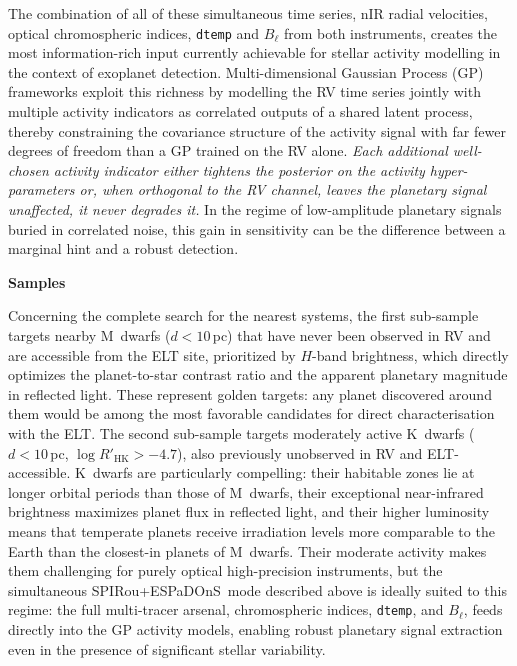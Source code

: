 \documentclass[
    traditabstract,
    longauth,
    onecolumn,
]{aa}
\def \spi{SPIRou}
\def \esp{ESPaDOnS}
\begin{document}
The combination of all of these simultaneous time series, nIR radial velocities, optical chromospheric indices, \texttt{dtemp} and $B_\ell$ from both instruments, creates the most information-rich input currently achievable for stellar activity modelling in the context of exoplanet detection.
Multi-dimensional Gaussian Process (GP) frameworks \citep{rajpaul2015, haywood_unsigned_2022, hara2025} exploit this richness by modelling the RV time series jointly with multiple activity indicators as correlated outputs of a shared latent process, thereby constraining the covariance structure of the activity signal with far fewer degrees of freedom than a GP trained on the RV alone.
\textit{Each additional well-chosen activity indicator either tightens the posterior on the activity hyper-parameters or, when orthogonal to the RV channel, leaves the planetary signal unaffected, it never degrades it.}
In the regime of low-amplitude planetary signals buried in correlated noise, this gain in sensitivity can be the difference between a marginal hint and a robust detection.



\textbf{Samples} 


Concerning the complete search for the nearest systems, the first sub-sample targets nearby M~dwarfs ($d < 10$\,pc) that have never been observed in RV and are accessible from the ELT site, prioritized by $H$-band brightness, which directly optimizes the planet-to-star contrast ratio and the apparent planetary magnitude in reflected light.
These represent golden targets: any planet discovered around them would be among the most favorable candidates for direct characterisation with the ELT.
The second sub-sample targets moderately active K~dwarfs ($d < 10$\,pc, $\log R'_\mathrm{HK} > -4.7$), also previously unobserved in RV and ELT-accessible. 
K~dwarfs are particularly compelling: their habitable zones lie at longer orbital periods than those of M~dwarfs, their exceptional near-infrared brightness maximizes planet flux in reflected light, and their higher luminosity means that temperate planets receive irradiation levels more comparable to the Earth than the closest-in planets of M~dwarfs. 
Their moderate activity makes them challenging for purely optical high-precision instruments, but the simultaneous \spi+\esp\ mode described above is ideally suited to this regime: the full multi-tracer arsenal, chromospheric indices, \texttt{dtemp}, and $B_\ell$, feeds directly into the GP activity models, enabling robust planetary signal extraction even in the presence of significant stellar variability.
\end{document}
